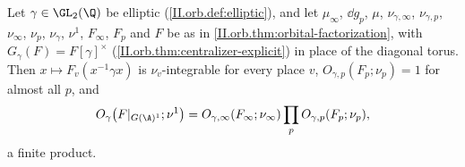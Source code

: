 Let $\gamma\in\GL_2(\Q)$ be elliptic (\cref{II.orb.def:elliptic}), and let $\mu_\infty$, $\dd g_p$, $\mu$, $\nu_{\gamma,\infty}$, $\nu_{\gamma,p}$, $\nu_\infty$, $\nu_p$, $\nu_\gamma$, $\nu^1$, $F_\infty$, $F_p$ and $F$ be
as in \cref{II.orb.thm:orbital-factorization}, with $G_\gamma(F)=F[\gamma]^\times$ (\cref{II.orb.thm:centralizer-explicit}) in place of the diagonal torus. Then
$x\mapsto F_v(x^{-1}\gamma x)$ is $\nu_v$-integrable for every place $v$, $O_{\gamma,p}(F_p;\nu_p)=1$ for almost all $p$, and
\[
  O_\gamma\bigl(F|_{G(\A)^1};\nu^1\bigr)=O_{\gamma,\infty}(F_\infty;\nu_\infty)\prod_pO_{\gamma,p}(F_p;\nu_p),
\]
a finite product.
